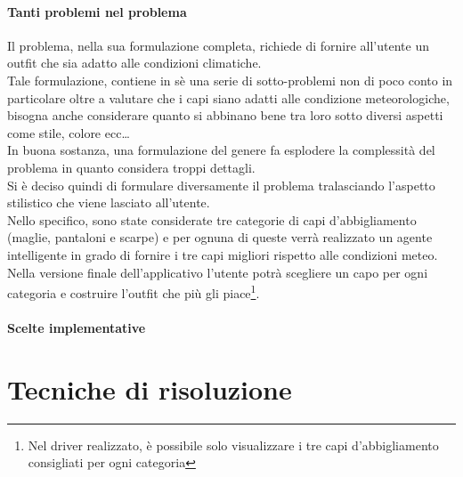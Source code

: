 \documentclass[a4paper, 11pt, oneside]{report}
\begin{document}
    \subsection{Tanti problemi nel problema}
    Il problema, nella sua formulazione completa, richiede di fornire all'utente un outfit che sia adatto
    alle condizioni climatiche.\\
    Tale formulazione, contiene in sè una serie di sotto-problemi non di poco conto in particolare oltre
    a valutare che i capi siano adatti alle condizione meteorologiche, bisogna anche considerare quanto si abbinano bene
    tra loro sotto diversi aspetti come stile, colore ecc\ldots\\
    In buona sostanza, una formulazione del genere fa esplodere la complessità del problema in quanto considera troppi dettagli.\\
    Si è deciso quindi di formulare diversamente il problema tralasciando l'aspetto stilistico che viene lasciato all'utente.\\
    Nello specifico, sono state considerate tre categorie di capi d'abbigliamento (maglie, pantaloni e scarpe) e per ognuna di queste verrà realizzato
    un agente intelligente in grado di fornire i tre capi migliori rispetto alle condizioni meteo.
    Nella versione finale dell'applicativo l'utente potrà scegliere un capo per ogni categoria e costruire l'outfit che più gli piace\footnote{Nel driver realizzato, è possibile solo visualizzare i tre capi d'abbigliamento consigliati per ogni categoria}.
    \subsection{Scelte implementative}

    \part{Tecniche di risoluzione}
\end{document}
